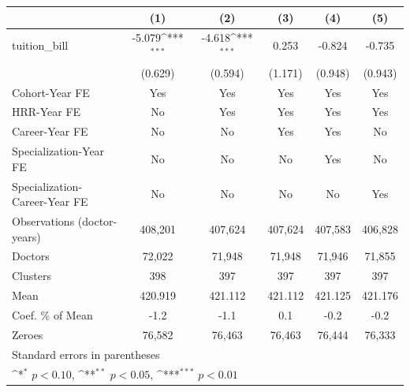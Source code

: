 {
\def\sym#1{\ifmmode^{#1}\else\(^{#1}\)\fi}
\begin{tabular}{l*{5}{c}}
\hline\hline
                    &\multicolumn{1}{c}{(1)}         &\multicolumn{1}{c}{(2)}         &\multicolumn{1}{c}{(3)}         &\multicolumn{1}{c}{(4)}         &\multicolumn{1}{c}{(5)}         \\
\hline
tuition\_bill        &      -5.079\sym{***}&      -4.618\sym{***}&       0.253         &      -0.824         &      -0.735         \\
                    &     (0.629)         &     (0.594)         &     (1.171)         &     (0.948)         &     (0.943)         \\
[1em]
Cohort-Year FE      &         Yes         &         Yes         &         Yes         &         Yes         &         Yes         \\
[1em]
HRR-Year FE         &          No         &         Yes         &         Yes         &         Yes         &         Yes         \\
[1em]
Career-Year FE      &          No         &          No         &         Yes         &         Yes         &          No         \\
[1em]
Specialization-Year FE&          No         &          No         &          No         &         Yes         &          No         \\
[1em]
Specialization-Career-Year FE&          No         &          No         &          No         &          No         &         Yes         \\
\hline
Observations (doctor-years)&     408,201         &     407,624         &     407,624         &     407,583         &     406,828         \\
Doctors             &      72,022         &      71,948         &      71,948         &      71,946         &      71,855         \\
Clusters            &         398         &         397         &         397         &         397         &         397         \\
Mean                &     420.919         &     421.112         &     421.112         &     421.125         &     421.176         \\
Coef. \% of Mean    &        -1.2         &        -1.1         &         0.1         &        -0.2         &        -0.2         \\
Zeroes              &      76,582         &      76,463         &      76,463         &      76,444         &      76,333         \\
\hline\hline
\multicolumn{6}{l}{\footnotesize Standard errors in parentheses}\\
\multicolumn{6}{l}{\footnotesize \sym{*} \(p<0.10\), \sym{**} \(p<0.05\), \sym{***} \(p<0.01\)}\\
\end{tabular}
}
